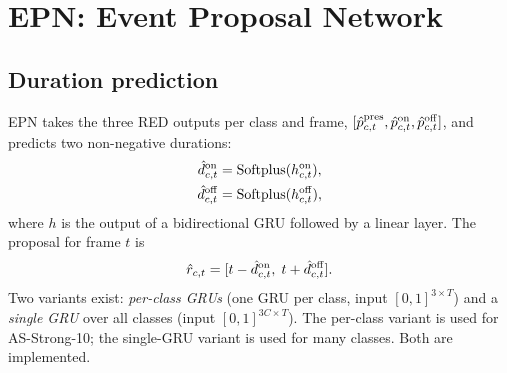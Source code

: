 \section{EPN: Event Proposal Network}

\subsection{Duration prediction}
EPN takes the three RED outputs per class and frame,
$[\hat p^{\mathrm{pres}}_{c,t},\hat p^{\mathrm{on}}_{c,t},\hat p^{\mathrm{off}}_{c,t}]$, and predicts
two non-negative durations:
\begin{align}
\hat d^{\mathrm{on}}_{c,t} &= \operatorname{Softplus}(h^{\mathrm{on}}_{c,t}),\\
\hat d^{\mathrm{off}}_{c,t} &= \operatorname{Softplus}(h^{\mathrm{off}}_{c,t}),
\end{align}
where $h$ is the output of a bidirectional GRU followed by a linear layer.
The proposal for frame $t$ is
\begin{equation}
\hat r_{c,t}
=
[t-\hat d^{\mathrm{on}}_{c,t},\; t+\hat d^{\mathrm{off}}_{c,t}].
\end{equation}
Two variants exist: \emph{per-class GRUs} (one GRU per class, input
$[0,1]^{3\times T}$) and a \emph{single GRU} over all classes (input
$[0,1]^{3C\times T}$). The per-class variant is used for AS-Strong-10; the
single-GRU variant is used for many classes. Both are implemented.

